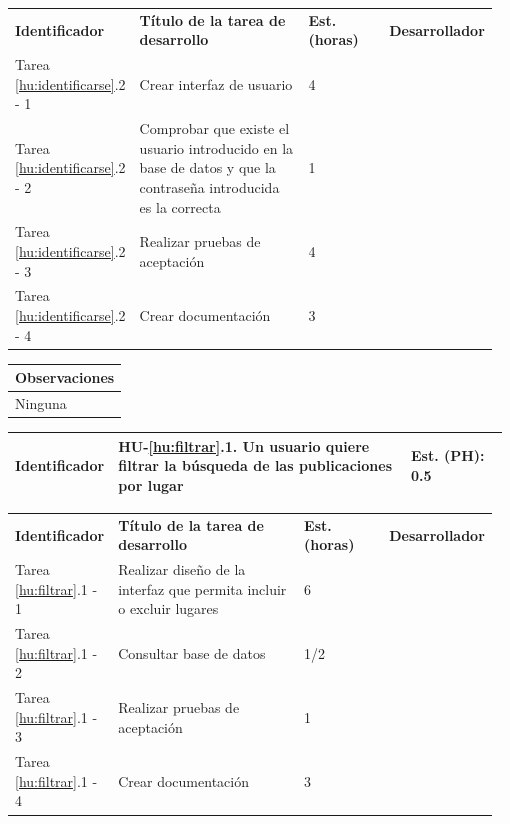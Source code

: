 \documentclass[11pt]{article}
\begin{document}
\begin{longtable}{p{0.18\linewidth}|p{0.4\linewidth}|p{0.18\linewidth}|p{0.2\linewidth}}
	\toprule
	\textbf{Identificador} & \textbf{Título de la tarea de desarrollo} & \textbf{Est. (horas)} & \textbf{Desarrollador} \\
        Tarea \ref{hu:identificarse}.2 - 1 & Crear interfaz de usuario & 4 &\\
        Tarea \ref{hu:identificarse}.2 - 2 & Comprobar que existe el usuario introducido en la base de datos y que la contraseña introducida es la correcta & 1 & \\
        Tarea \ref{hu:identificarse}.2 - 3 & Realizar pruebas de aceptación & 4 & \\
       	Tarea \ref{hu:identificarse}.2 - 4 & Crear documentación & 3 & \\
	\bottomrule
\end{longtable}


\begin{longtable}{p{1.028\linewidth}}
	\textbf{Observaciones}\\
	\midrule
	Ninguna\\
	\bottomrule
	\bottomrule
\end{longtable}

\centering
\begin{longtable}{p{0.18\linewidth}|p{0.6\linewidth}|p{0.2\linewidth}}
	\toprule
	\toprule
	\textbf{Identificador} & \textbf{HU-\ref{hu:filtrar}.1}.  Un usuario quiere filtrar la búsqueda de las publicaciones por lugar & \textbf{Est. (PH):} 0.5 \\
	
	\bottomrule
\end{longtable}

\begin{longtable}{p{0.18\linewidth}|p{0.4\linewidth}|p{0.18\linewidth}|p{0.2\linewidth}}
	\toprule
	\textbf{Identificador} & \textbf{Título de la tarea de desarrollo} & \textbf{Est. (horas)} & \textbf{Desarrollador} \\
	Tarea \ref{hu:filtrar}.1 - 1 & Realizar diseño de la interfaz que permita incluir o excluir lugares & 6 &\\
	Tarea \ref{hu:filtrar}.1 - 2 & Consultar base de datos & 1/2 & \\
	Tarea \ref{hu:filtrar}.1 - 3 & Realizar pruebas de aceptación & 1 & \\
	Tarea \ref{hu:filtrar}.1 - 4 & Crear documentación & 3 & \\
	\bottomrule
\end{longtable}
\end{document}
